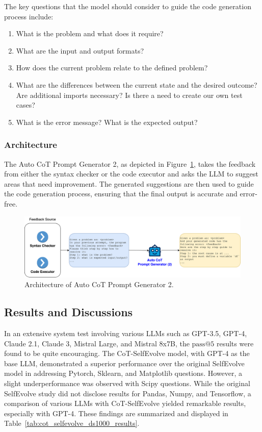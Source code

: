 \documentclass[a4paper,oneside]{book}
\begin{document}
The key questions that the model should consider to guide the code generation process include:
\begin{enumerate}
    \item What is the problem and what does it require?
    \item What are the input and output formats?
    \item How does the current problem relate to the defined problem?
    \item What are the differences between the current state and the desired outcome? Are additional imports necessary? Is there a need to create our own test cases?
    \item What is the error message? What is the expected output?
\end{enumerate}

\subsubsection{Architecture}
The Auto CoT Prompt Generator 2, as depicted in Figure~\ref{fig:cot_generator_2}, takes the feedback from either the syntax checker or the code executor and asks the LLM to suggest areas that need improvement. The generated suggestions are then used to guide the code generation process, ensuring that the final output is accurate and error-free.

\begin{figure}[H]
    \centering
    \includegraphics[width=1.0\textwidth]{img/cot_generator_2}
    \caption{Architecture of Auto CoT Prompt Generator 2.}\label{fig:cot_generator_2}
\end{figure}

\subsection{Results and Discussions}
In an extensive system test involving various LLMs such as GPT-3.5, GPT-4, Claude 2.1, Claude 3, Mistral Large, and Mistral 8x7B, the $\text{pass@5}$ results were found to be quite encouraging. The CoT-SelfEvolve model, with GPT-4 as the base LLM, demonstrated a superior performance over the original SelfEvolve model in addressing Pytorch, Sklearn, and Matplotlib questions. However, a slight underperformance was observed with Scipy questions. While the original SelfEvolve study did not disclose results for Pandas, Numpy, and Tensorflow, a comparison of various LLMs with CoT-SelfEvolve yielded remarkable results, especially with GPT-4. These findings are summarized and displayed in Table~\ref{tab:cot_selfevolve_ds1000_results}.
\end{document}
